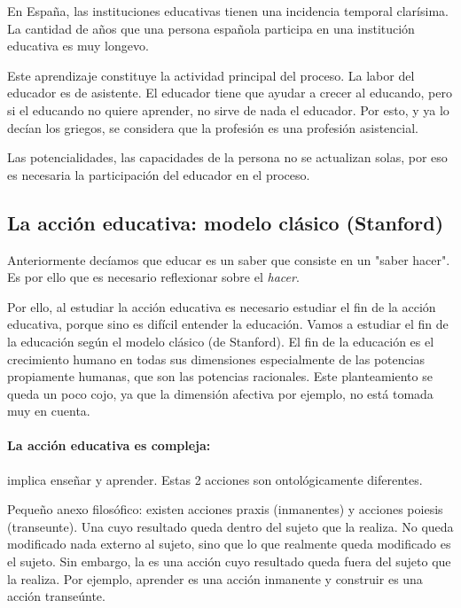 \documentclass[palatino]{apuntesURJC}
\begin{document}
En España, las instituciones educativas tienen una incidencia temporal clarísima. 
%
La cantidad de años que una persona española participa en una institución educativa es muy longevo.


Este aprendizaje constituye la actividad principal del proceso. 
%
La labor del educador es de asistente. 
%
El educador tiene que ayudar a crecer al educando, pero si el educando no quiere aprender, no sirve de nada el educador.
%
Por esto, y ya lo decían los griegos, se considera que la profesión es una profesión asistencial.

Las potencialidades, las capacidades de la persona no se actualizan solas, por eso es necesaria la participación del educador en el proceso. 

\subsection{La acción educativa: modelo clásico (Stanford)}
Anteriormente decíamos que educar es un saber que consiste en un "saber hacer". 
%
Es por ello que es necesario reflexionar sobre el \textit{hacer}.

Por ello, al estudiar la acción educativa es necesario estudiar el fin de la acción educativa, porque sino es difícil entender la educación.
%
Vamos a estudiar el fin de la educación según el modelo clásico (de Stanford).
%
El fin de la educación es el crecimiento humano en todas sus dimensiones especialmente de las potencias propiamente humanas, que son las potencias racionales.
%
Este planteamiento se queda un poco cojo, ya que la dimensión afectiva por ejemplo, no está tomada muy en cuenta.

\paragraph{La acción educativa es compleja:} implica enseñar y aprender. 
%
Estas 2 acciones son ontológicamente diferentes.

Pequeño anexo filosófico: existen acciones praxis (inmanentes) y acciones poiesis (transeunte). 
%
Una  cuyo resultado queda dentro del sujeto que la realiza. No queda modificado nada externo al sujeto, sino que lo que realmente queda modificado es el sujeto.
%
Sin embargo, la  es una acción cuyo resultado queda fuera del sujeto que la realiza.
Por ejemplo, aprender es una acción inmanente y construir es una acción transeúnte.
\end{document}
